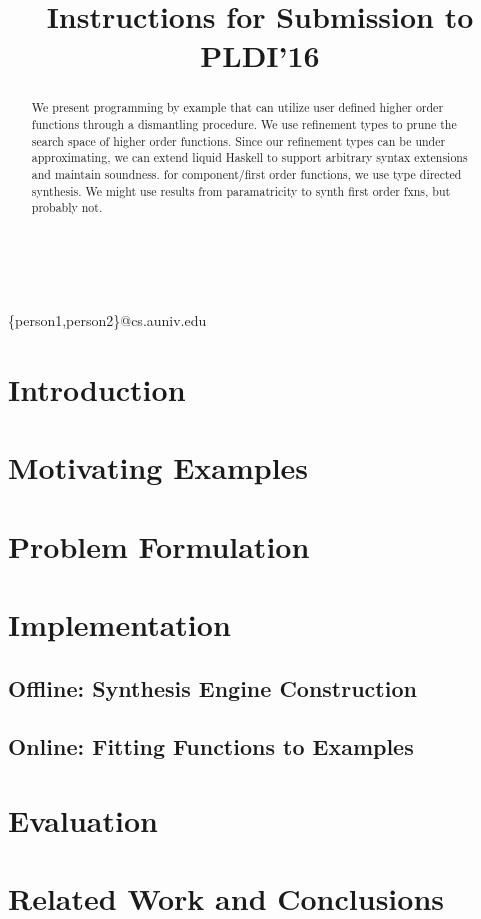 \documentclass[pldi]{sigplanconf-pldi16}
\begin{document}
\title{Instructions for Submission to PLDI'16}

%
%

{ \\
  \\
}
{\{person1,person2\}@cs.auniv.edu}



\maketitle

\begin{abstract}
  We present programming by example that can utilize user defined higher order functions through a dismantling procedure.
  We use refinement types to prune the search space of higher order functions.
  Since our refinement types can be under approximating, we can extend liquid Haskell to support arbitrary syntax extensions and maintain soundness.
  for component/first order functions, we use type directed synthesis.
  We might use results from paramatricity to synth first order fxns, but probably not.
\end{abstract}


\section{Introduction} \label{intro}



\section{Motivating Examples} \label{examples}


\section{Problem Formulation}


\section{Implementation}


\subsection{Offline: Synthesis Engine Construction}


\subsection{Online: Fitting Functions to Examples}


\section{Evaluation}


\section{Related Work and Conclusions}




\end{document}
